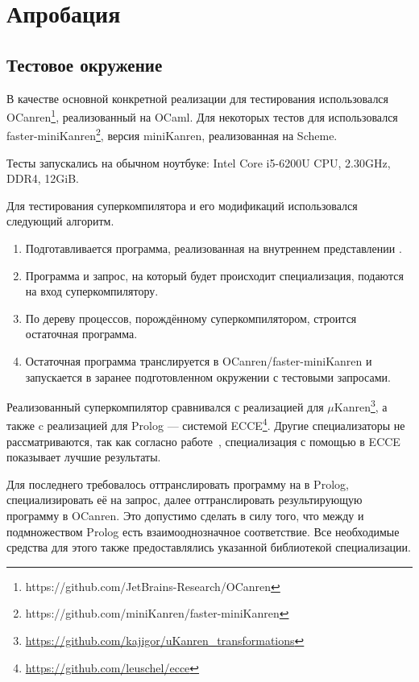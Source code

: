 \section{Апробация}
\label{sec:testing}

\subsection{Тестовое окружение}

В качестве основной конкретной реализации \ukanren для тестирования
использовался OCanren\footnote{https://github.com/JetBrains-Research/OCanren}\cite{ocanren},
реализованный на OCaml\cite{ocanren}.
Для некоторых тестов для использовался faster-miniKanren\footnote{https://github.com/miniKanren/faster-miniKanren},
версия miniKanren, реализованная на Scheme.

Тесты запускались на обычном ноутбуке: Intel Core i5-6200U CPU, 2.30GHz, DDR4, 12GiB.

Для тестирования суперкомпилятора и его модификаций использовался следующий алгоритм.
\begin{enumerate}
\item Подготавливается программа, реализованная на внутреннем представлении \ukanren.
\item Программа и запрос, на который будет происходит специализация, подаются на вход суперкомпилятору.
\item По дереву процессов, порождённому суперкомпилятором, строится остаточная программа.
\item Остаточная программа транслируется в OCanren/faster-miniKanren и
      запускается в заранее подготовленном окружении с тестовыми запросами.
\end{enumerate}


Реализованный суперкомпилятор сравнивался с реализацией \forcpd для $\mu$Kanren\footnote{\url{https://github.com/kajigor/uKanren_transformations}},
а также c реализацией \forcpd для Prolog --- системой ECCE\footnote{\url{https://github.com/leuschel/ecce}}.
Другие специализаторы не рассматриваются, так как согласно работе~\cite{controlPoly}, специализация с
помощью \cpd в ECCE показывает лучшие результаты.

Для последнего требовалось оттранслировать программу на \ukanren в Prolog, специализировать
её на запрос, далее оттранслировать результирующую программу в OCanren.
Это допустимо сделать в силу того, что между \ukanren и подмножеством Prolog есть
взаимооднозначное соответствие. 
Все необходимые средства для этого также предоставлялись указанной библиотекой специализации.


